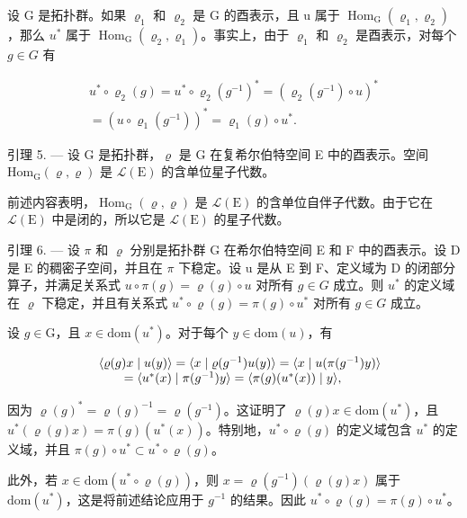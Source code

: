 设 G 是拓扑群。如果 \(\varrho_{1}\) 和 \(\varrho_{2}\) 是 G 的酉表示，且 u 属于 \(\operatorname{Hom}_{\mathrm{G}}(\varrho_{1},\varrho_{2})\)，那么 \(u^{*}\) 属于 \(\operatorname{Hom}_{\mathrm{G}}(\varrho_{2},\varrho_{1})\)。事实上，由于 \(\varrho_{1}\) 和 \(\varrho_{2}\) 是酉表示，对每个 \(g\in G\) 有

\[
\begin{array}{r} u ^ {*} \circ \varrho_ {2} (g) = u ^ {*} \circ \varrho_ {2} (g ^ {- 1}) ^ {*} = (\varrho_ {2} (g ^ {- 1}) \circ u) ^ {*} \\ = (u \circ \varrho_ {1} (g ^ {- 1})) ^ {*} = \varrho_ {1} (g) \circ u ^ {*}. \end{array}
\]

引理 5. --- 设 G 是拓扑群，\(\varrho\) 是 G 在复希尔伯特空间 E 中的酉表示。空间 \(\mathrm{Hom}_{\mathrm{G}}(\varrho, \varrho)\) 是 \(\mathcal{L}(\mathrm{E})\) 的含单位星子代数。

前述内容表明，\(\operatorname{Hom}_{\mathrm{G}}(\varrho,\varrho)\) 是 \(\mathcal{L}(\mathrm{E})\) 的含单位自伴子代数。由于它在 \(\mathcal{L}(\mathrm{E})\) 中是闭的，所以它是 \(\mathcal{L}(\mathrm{E})\) 的星子代数。

引理 6. --- 设 \(\pi\) 和 \(\varrho\) 分别是拓扑群 G 在希尔伯特空间 E 和 F 中的酉表示。设 D 是 E 的稠密子空间，并且在 \(\pi\) 下稳定。设 u 是从 E 到 F、定义域为 D 的闭部分算子，并满足关系式 \(u \circ \pi(g) = \varrho(g) \circ u\) 对所有 \(g \in G\) 成立。则 \(u^{*}\) 的定义域在 \(\varrho\) 下稳定，并且有关系式 \(u^{*} \circ \varrho(g) = \pi(g) \circ u^{*}\) 对所有 \(g \in G\) 成立。

设 \(g \in \mathrm{G}\)，且 \(x \in \mathrm{dom}(u^*)\)。对于每个 \(y \in \mathrm{dom}(u)\)，有

\[
\begin{array}{r l} & {\langle \varrho (g) x \mid u (y) \rangle = \langle x \mid \varrho (g ^ {- 1}) u (y) \rangle = \langle x \mid u (\pi (g ^ {- 1}) y) \rangle} \\ & {\qquad = \langle u ^ {*} (x) \mid \pi (g ^ {- 1}) y \rangle = \langle \pi (g) (u ^ {*} (x)) \mid y \rangle ,} \end{array}
\]

因为 \(\varrho(g)^{*} = \varrho(g)^{-1} = \varrho(g^{-1})\)。这证明了 \(\varrho(g)x \in \mathrm{dom}(u^{*})\)，且 \(u^{*}(\varrho(g)x) = \pi(g)(u^{*}(x))\)。特别地，\(u^{*} \circ \varrho(g)\) 的定义域包含 \(u^{*}\) 的定义域，并且 \(\pi(g) \circ u^{*} \subset u^{*} \circ \varrho(g)\)。

此外，若 \(x \in \text{dom}(u^{*} \circ \varrho(g))\)，则 \(x = \varrho(g^{-1})(\varrho(g)x)\) 属于 \(\text{dom}(u^{*})\)，这是将前述结论应用于 \(g^{-1}\) 的结果。因此 \(u^{*} \circ \varrho(g) = \pi(g) \circ u^{*}\)。


